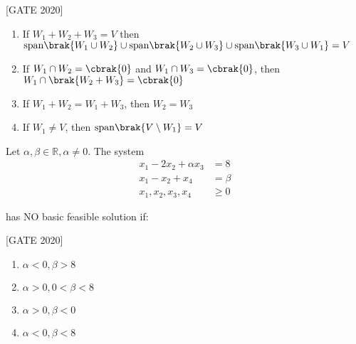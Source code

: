     \hfill{[GATE 2020]}\begin{enumerate}
        \item If $ W_1 + W_2 + W_3 = V $ then $ \text{span}\brak{W_1 \cup W_2} \cup \text{span}\brak{W_2 \cup W_3} \cup \text{span}\brak{W_3 \cup W_1} = V $
        \item If $ W_1 \cap W_2 = \cbrak{0} $ and $ W_1 \cap W_3 = \cbrak{0} $, then $ W_1 \cap \brak{W_2 + W_3} = \cbrak{0} $
        \item If $ W_1 + W_2 = W_1 + W_3 $, then $ W_2 = W_3 $
        \item If $ W_1 \neq V $, then $ \text{span}\brak{V \setminus W_1} = V $
    \end{enumerate}
    

    \item    Let $ \alpha, \beta \in \mathbb{R}, \alpha \neq 0 $. The system 
    \begin{align*}
    x_1 - 2x_2 + \alpha x_3 &= 8 \\
    x_1 - x_2 + x_4 &= \beta \\
    x_1, x_2, x_3, x_4 &\geq 0
\end{align*}

    has NO basic feasible solution if:
    
    \hfill{[GATE 2020]}\begin{multicols}{2}\begin{enumerate}
        \item $ \alpha < 0, \beta > 8 $
        \item $ \alpha > 0, 0 < \beta < 8 $
        \item $ \alpha > 0, \beta < 0 $
        \item $ \alpha < 0, \beta < 8 $
    \end{enumerate}
    \end{multicols}

